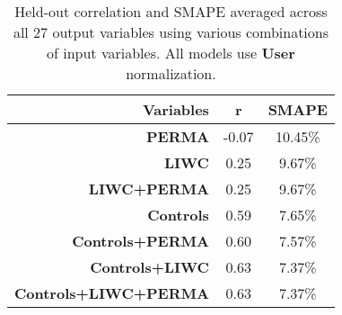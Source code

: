 \begin{table}[t]
\centering
\begin{tabular}{|r|c|c|}
\hline
               {\bf Variables}	& {\bf r}	& {\bf SMAPE}\\
\hline
                   {\bf PERMA}	& -0.07 	& 10.45\%\\
                    {\bf LIWC}	& 0.25 	& 9.67\%\\
              {\bf LIWC+PERMA}	& 0.25 	& 9.67\%\\
                {\bf Controls}	& 0.59 	& 7.65\%\\
          {\bf Controls+PERMA}	& 0.60 	& 7.57\%\\
           {\bf Controls+LIWC}	& 0.63 	& 7.37\%\\
     {\bf Controls+LIWC+PERMA}	& 0.63 	& 7.37\%\\
\hline
\end{tabular}
\caption{Held-out correlation and SMAPE averaged across all 27 output variables using various combinations of input variables. All models use {\bf User} normalization. \label{tab.features}}
\end{table}
